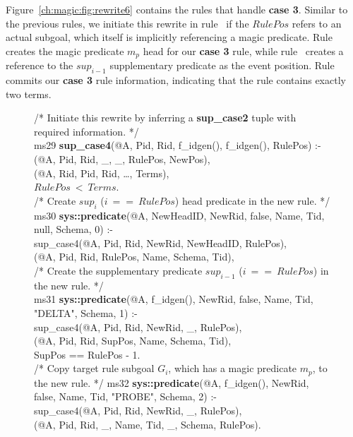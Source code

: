 Figure~\ref{ch:magic:fig:rewrite6} contains the rules that handle {\bf case 3}.
Similar to the previous rules, we initiate this rewrite in rule~ if
the $RulePos$ refers to an actual subgoal, which itself is implicitly
referencing a magic predicate.  Rule~ creates the magic predicate
$m_p$ head for our {\bf case 3} rule, while rule~ creates a reference
to the $sup_{i-1}$ supplementary predicate as the event position.
Rule~ commits our {\bf case 3} rule information, indicating that the
rule contains exactly two terms.

\begin{figure}[!t]
\ssp
\centering
\begin{boxedminipage}{\linewidth}
/* Initiate this rewrite by inferring a {\bf sup\_case2} tuple with required information. */ \\
ms29 {\bf sup\_case4}(@A, Pid, Rid, f\_idgen(), f\_idgen(), RulePos) :- \\
(@A, Pid, Rid, \_, \_, RulePos, NewPos), \\
(@A, Rid, Pid, Rid, \ldots, Terms), \\
\datalogspace $RulePos\ <\ Terms$. \\
	
/* Create $sup_i$ ($i\ ==\ RulePos$) head predicate in the new rule. */ \\
ms30 {\bf sys::predicate}(@A, NewHeadID, NewRid, false, Name, Tid, null, Schema, 0) :- \\
\datalogspace sup\_case4(@A, Pid, Rid, NewRid, NewHeadID, RulePos), \\
(@A, Pid, Rid, RulePos, Name, Schema, Tid), \\
	
/* Create the supplementary predicate $sup_{i-1}$ ($i\ ==\ RulePos$) in the new rule. */ \\
ms31 {\bf sys::predicate}(@A, f\_idgen(), NewRid, false, Name, Tid, "DELTA", Schema, 1) :- \\
\datalogspace sup\_case4(@A, Pid, Rid, NewRid, \_, RulePos), \\
(@A, Pid, Rid, SupPos, Name, Schema, Tid), \\
\datalogspace SupPos == RulePos - 1. \\

/* Copy target rule subgoal $G_i$, which has a magic predicate $m_p$, to the new rule. */
ms32 {\bf sys::predicate}(@A, f\_idgen(), NewRid, false, Name, Tid, "PROBE", Schema, 2) :- \\
\datalogspace sup\_case4(@A, Pid, Rid, NewRid, \_, RulePos), \\
(@A, Pid, Rid, \_, Name, Tid, \_, Schema, RulePos). \\
	

\end{boxedminipage}
\end{figure}
